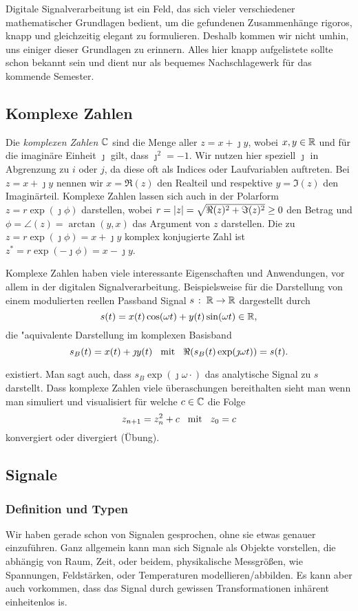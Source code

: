 %
Digitale Signalverarbeitung ist ein Feld, das sich vieler verschiedener mathematischer Grundlagen bedient, um die gefundenen Zusammenhänge rigoros, knapp und gleichzeitig elegant zu formulieren.
Deshalb kommen wir nicht umhin, uns einiger dieser Grundlagen zu erinnern. 
Alles hier knapp aufgelistete sollte schon bekannt sein und dient nur als bequemes Nachschlagewerk für das kommende Semester.
%
\subsection{Komplexe Zahlen}
%
Die \emph{komplexen Zahlen} $\mathbb{C}$ sind die Menge aller $z = x + \jmath y$, wobei $x,y \in \mathbb{R}$ und für die imaginäre Einheit $\jmath$ gilt, dass $\jmath^2 = -1$.
Wir nutzen hier speziell $\jmath$ in Abgrenzung zu $i$ oder $j$, da diese oft als Indices oder Laufvariablen auftreten.
Bei $z = x + \jmath y$ nennen wir $x =\Re(z)$ den Realteil und respektive $y = \Im(z)$ den Imaginärteil.
Komplexe Zahlen lassen sich auch in der Polarform $z = r \exp(\jmath \phi)$ darstellen, wobei $r = {\left| z \right|} = \sqrt{\Re(z)^2 + \Im(z)^2} \geq 0$ den Betrag und $\phi = \angle(z) = \arctan(y,x)$ das Argument von $z$ darstellen.
Die zu $z = r \exp(\jmath \phi) = x + \jmath y$ komplex konjugierte Zahl ist $z^\ast = r \exp(-\jmath \phi) = x - \jmath y$.

Komplexe Zahlen haben viele interessante Eigenschaften und Anwendungen, vor allem in der digitalen Signalverarbeitung.
Beispielsweise für die Darstellung von einem modulierten reellen Passband Signal $s \hspace{0.5mm}:\hspace{1.0mm} \mathbb{R} \rightarrow \mathbb{R}$ dargestellt durch
\[
s(t) = x(t)\cos(\omega t) + y(t)\sin(\omega t) \in \mathbb{R},
\]
die "aquivalente Darstellung im komplexen Basisband
\begin{equation}\label{complex_baseband}
    s_B(t) = x(t) + \jmath y(t) {\hspace{3mm} \text{mit} \hspace{3mm}} \Re(s_B(t)\exp(\jmath \omega t)) = s(t).
\end{equation}

existiert. Man sagt auch, dass $s_B \exp(\jmath \omega \cdot)$ das analytische Signal zu $s$ darstellt. Dass komplexe Zahlen viele überaschungen bereithalten sieht man wenn man simuliert und visualisiert für welche $c \in \mathbb{C}$ die Folge
\[
z_{n+1} = z_{n}^2 + c {\hspace{3mm} \text{mit} \hspace{3mm}} z_0 = c
\]
konvergiert oder divergiert (Übung).
%
%
\subsection{Signale}
%
\subsubsection{Definition und Typen}
%
Wir haben gerade schon von Signalen gesprochen, ohne sie etwas genauer einzuführen. 
Ganz allgemein kann man sich Signale als Objekte vorstellen, die abhängig von Raum, Zeit, oder beidem, physikalische Messgrößen, wie Spannungen, Feldstärken, oder Temperaturen modellieren/abbilden.
Es kann aber auch vorkommen, dass das Signal durch gewissen Transformationen inhärent einheitenlos is.

